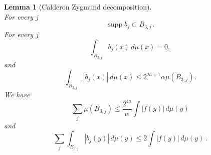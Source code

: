 \documentclass[10pt,a4paper]{article}
\theoremstyle{plain}
\newtheorem{lemma}[theorem]{Lemma}
\theoremstyle{definition}
\numberwithin{equation}{subsection}
\begin{document}
\begin{lemma}[Calderon Zygmund decomposition]
\begin{equation}
    \end{equation}
    For every $j$
    \begin{equation}
        \label{eq-supp-bj}
        \operatorname{supp} b_j \subset B_{3,j}\,.
    \end{equation}
    For every $j$
    \begin{equation}
        \label{eq-bad-mean-zero}
        \int_{B_{3,j}} b_j(x)\, d\mu(x)=0,
    \end{equation}
    and
     \begin{equation}
        \label{eq-bj-L1}
        \int_{B_{3,j}} |b_j(x)|\, d\mu(x) \leq 2^{2a+1} \alpha \mu(B_{3,j}).
    \end{equation}
    We have
    \begin{equation}
        \label{eq-bset-length-sum}
        \sum_j \mu(B_{3,j})\leq \frac{2^{4a}}{\alpha}\int |f(y)|\, d\mu(y)
    \end{equation}
    and
    \begin{equation}
    \label{eq-b-L1}
    \sum_{j}\int_{B_{3,j}} |b_j(y)|\, d\mu(y)\leq 2 \int |f(y)|\, d\mu(y)\,.
    \end{equation}
\end{lemma}
\end{document}
